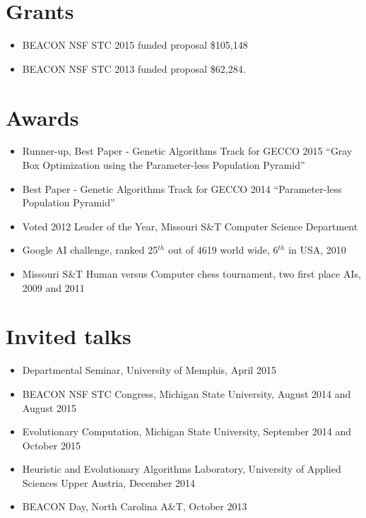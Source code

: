 \documentclass[a4paper,11pt]{article}
\begin{document}
\begin{publications}
\end{publications}

\section{Grants}
\begin{itemize}
\item BEACON NSF STC 2015 funded proposal \$105,148
\item BEACON NSF STC 2013 funded proposal \$62,284.
\end{itemize}

\section{Awards}
\begin{itemize}
\item     Runner-up, Best Paper - Genetic Algorithms Track for GECCO 2015 ``Gray Box Optimization using the Parameter-less Population Pyramid''
\item     Best Paper - Genetic Algorithms Track for GECCO 2014 ``Parameter-less Population Pyramid''
\item     Voted 2012 Leader of the Year, Missouri S\&T Computer Science Department
\item     Google AI challenge, ranked 25$^{th}$ out of 4619 world wide, 6$^{th}$ in USA, 2010
\item     Missouri S\&T Human versus Computer chess tournament, two first place AIs, 2009 and 2011
\end{itemize}

\section{Invited talks}
\begin{itemize}
\item Departmental Seminar, University of Memphis, April 2015
\item BEACON NSF STC Congress, Michigan State University, August 2014 and August 2015
\item Evolutionary Computation, Michigan State University, September 2014 and October 2015
\item Heuristic and Evolutionary Algorithms Laboratory, University of Applied Sciences Upper Austria, December 2014
\item BEACON Day, North Carolina A\&T, October 2013
\end{itemize}
\end{document}
